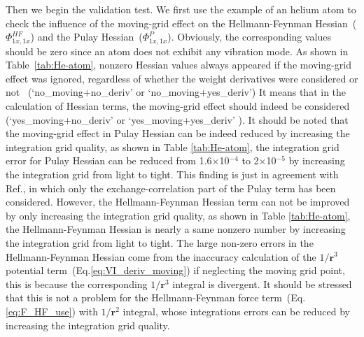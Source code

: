 \documentclass[journal=jpca,manuscript=article]{achemso}
\begin{document}
Then we begin the validation test. We first use the example of an helium atom to check the influence of the moving-grid effect on the Hellmann-Feynman Hessian~($\Phi^{HF}_{1x,1x}$) and the Pulay Hessian~($\Phi^{P}_{1x,1x}$). Obviously, the corresponding values should be zero since an atom does not exhibit any vibration mode. As shown in Table~\ref{tab:He-atom}, nonzero Hessian values always appeared if the moving-grid effect was ignored, regardless of whether the weight derivatives were considered or not
~(`no\_moving+no\_deriv'  or `no\_moving+yes\_deriv')
 It means that in the calculation of Hessian terms, the moving-grid effect should indeed be considered (`yes\_moving+no\_deriv'  or `yes\_moving+yes\_deriv'  ). It should be noted that the moving-grid effect in Pulay Hessian can be indeed reduced by increasing the integration grid quality, as shown in Table \ref{tab:He-atom}, the integration grid error for Pulay Hessian can be reduced from 1.6$\times$10$^{-4}$ to 2$\times$10$^{-5}$ by increasing the integration grid from light to tight.
This finding is just in agreement with Ref.\cite{Malagoli2003}, in which only the exchange-correlation part of the Pulay term has been considered. However, the Hellmann-Feynman Hessian term can not be improved by only increasing the integration grid quality,
as shown in Table \ref{tab:He-atom}, the Hellmann-Feynman Hessian is nearly a same nonzero number by increasing the integration grid from light to tight.
The large non-zero errors in the Hellmann-Feynman Hessian come from the inaccuracy calculation of the $1/\mathbf{r}^3$ potential term~(Eq.\ref{eq:VI_deriv_moving}) if neglecting the moving grid point, this is because the corresponding $1/\mathbf{r}^3$ integral 
is divergent. It should be stressed that this is not a problem for the Hellmann-Feynman force term~(Eq.\ref{eq:F_HF_use}) with $1/\mathbf{r}^2$ integral, whose
integrations errors can be reduced by increasing the integration grid quality. 


 
\end{document}
